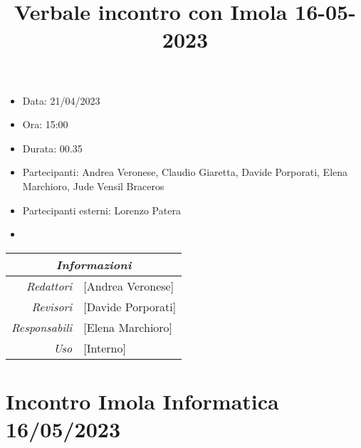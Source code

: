 \documentclass[12pt]{article}
\begin{document}
\graphicspath{ {../../templates/img} }

\title{Verbale incontro con Imola 16-05-2023}
\firstPage
\maketitle

\begin{center}
    \begin{itemize}
        \item[] Data: 21/04/2023
        \item[] Ora: 15:00
        \item[] Durata: 00.35
        \item[] Partecipanti: Andrea Veronese, Claudio Giaretta, Davide Porporati, Elena Marchioro, Jude Vensil Braceros
        \item[] Partecipanti esterni: Lorenzo Patera
        \item[] 
        \end{itemize}
    \begin{tabular}{r | l}
		\multicolumn{2}{c}{\textit{Informazioni}}\\
		\hline
			\textit{Redattori} &
			[Andrea Veronese]\makecell{}\\
			\textit{Revisori} &
			[Davide Porporati]\makecell{}\\
			\textit{Responsabili} &
			[Elena Marchioro]\makecell{}\\
		    \textit{Uso} & 
            [Interno]\makecell{}\\
\end{tabular}
\end{center}

\tableofcontents
\printindex
\section{Incontro Imola Informatica 16/05/2023}
\end{document}
